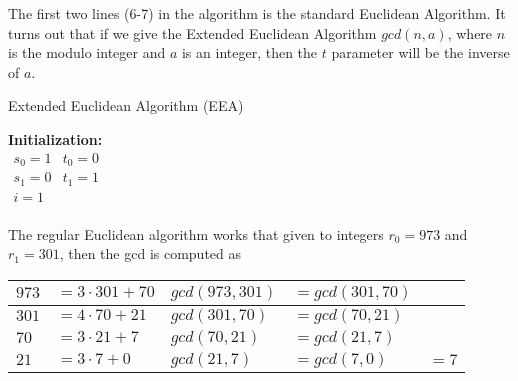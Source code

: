 \noindent
{} The first two lines (6-7) in the algorithm is the standard Euclidean Algorithm. It turns out that if we give the Extended Euclidean Algorithm $gcd(n,a)$, where $n$ is the modulo integer and $a$ is an integer, then the $t$ parameter will be the inverse of $a$. 

\begin{center}
\begin{algorithm}[H]
\caption{Extended Euclidean Algorithm (EEA)\label{alg}}



\textbf{Initialization:} \\
$
\begin{array}{ll}
    s_0 = 1   & t_0 = 0 \\
    s_1 = 0   & t_1 = 1 \\
      i = 1     &           \\
\end{array}                 
$

\end{algorithm}
\end{center}



 The regular Euclidean algorithm works that given to integers $r_0 = 973$ and $r_1 = 301$, then the gcd is computed as 

\begin{center}
\begin{tabular}{|ll|lll| } 
\hline
$973$ & $= 3 \cdot 301 +70$& $gcd(973,301)$ & $= gcd(301,70)$ & \\ 
\hline
$301$ & $= 4 \cdot 70+21$ & $gcd(301,70)$ & $= gcd(70,21)$ &\\ 
\hline
$70$ & $= 3 \cdot 21+7$ & $gcd(70,21)$ & $= gcd(21,7)$ & \\ 
\hline
$21$ & $= 3 \cdot 7+0$ & $gcd(21,7)$ & $= gcd(7,0)$ & $= 7$ \\ 
\hline
\end{tabular}
\end{center}

